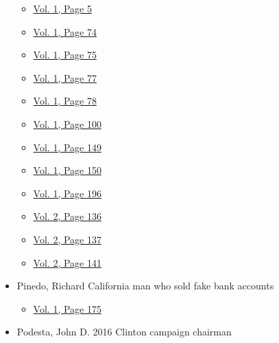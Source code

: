\begin{itemize}
  \begin{itemize}
  \tightlist
  \item
    \protect\hyperlink{g-page-13}{Vol. 1, Page 5}
  \item
    \protect\hyperlink{g-page-82}{Vol. 1, Page 74}
  \item
    \protect\hyperlink{g-page-83}{Vol. 1, Page 75}
  \item
    \protect\hyperlink{g-page-85}{Vol. 1, Page 77}
  \item
    \protect\hyperlink{g-page-86}{Vol. 1, Page 78}
  \item
    \protect\hyperlink{g-page-108}{Vol. 1, Page 100}
  \item
    \protect\hyperlink{g-page-157}{Vol. 1, Page 149}
  \item
    \protect\hyperlink{g-page-158}{Vol. 1, Page 150}
  \item
    \protect\hyperlink{g-page-204}{Vol. 1, Page 196}
  \item
    \protect\hyperlink{g-page-348}{Vol. 2, Page 136}
  \item
    \protect\hyperlink{g-page-349}{Vol. 2, Page 137}
  \item
    \protect\hyperlink{g-page-353}{Vol. 2, Page 141}
  \end{itemize}
\item
  Pinedo, Richard California man who sold fake bank accounts

  \begin{itemize}
  \tightlist
  \item
    \protect\hyperlink{g-page-183}{Vol. 1, Page 175}
  \end{itemize}
\item
  Podesta, John D. 2016 Clinton campaign chairman


\end{itemize}
